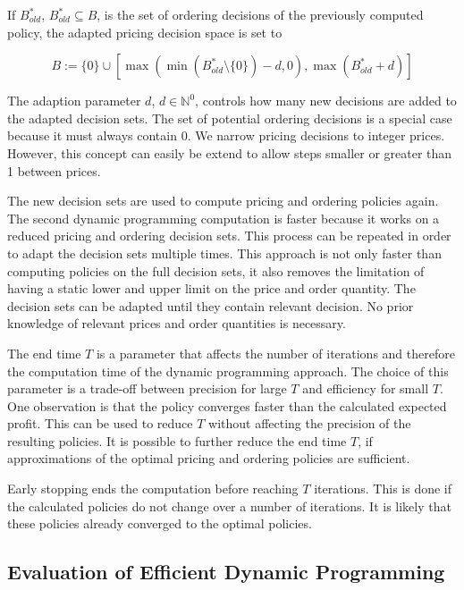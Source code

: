 If $B^*_{old}$, $B^*_{old} \subseteq B$, is the set of ordering decisions of the previously computed policy, the adapted pricing decision space is set to

\begin{equation}
B := \{0\} \cup [\max(\min(B^*_{old} \setminus \{0\}) - d, 0), \max(B^*_{old} + d)]
\end{equation}

The adaption parameter $d$, $d \in \mathbb{N}^0$, controls how many new decisions are added to the adapted decision sets.
The set of potential ordering decisions is a special case because it must always contain 0.
We narrow pricing decisions to integer prices.
However, this concept can easily be extend to allow steps smaller or greater than 1 between prices.

The new decision sets are used to compute pricing and ordering policies again.
The second dynamic programming computation is faster because it works on a reduced pricing and ordering decision sets.
This process can be repeated in order to adapt the decision sets multiple times.
This approach is not only faster than computing policies on the full decision sets, it also removes the limitation of having a static lower and upper limit on the price and order quantity.
The decision sets can be adapted until they contain relevant decision.
No prior knowledge of relevant prices and order quantities is necessary.

The end time $T$ is a parameter that affects the number of iterations and therefore the computation time of the dynamic programming approach.
The choice of this parameter is a trade-off between precision for large $T$ and efficiency for small $T$.
One observation is that the policy converges faster than the calculated expected profit.
This can be used to reduce $T$ without affecting the precision of the resulting policies.
It is possible to further reduce the end time $T$, if approximations of the optimal pricing and ordering policies are sufficient.

Early stopping ends the computation before reaching $T$ iterations.
This is done if the calculated policies do not change over a number of iterations.
It is likely that these policies already converged to the optimal policies.

\subsection{Evaluation of Efficient Dynamic Programming}

